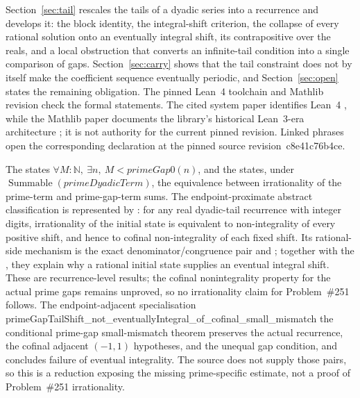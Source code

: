 \documentclass[11pt]{article}
\renewcommand{\commitshort}{c8e41c76b4ce}
\begin{document}
Section~\ref{sec:tail} rescales the tails of a dyadic series into a recurrence
and develops it: the block identity, the integral-shift criterion, the
collapse of every rational solution onto an eventually integral shift, its
contrapositive over the reals, and a local obstruction that converts an
infinite-tail condition into a single comparison of gaps.
Section~\ref{sec:carry} shows that the tail constraint does not by itself make
the coefficient sequence eventually periodic, and Section~\ref{sec:open} states
the remaining obligation.  The pinned Lean~4 toolchain and Mathlib revision
check the formal statements.  The cited system paper identifies Lean~4
\cite[abstract and \S1, pp.~625--626]{lean4}, while the Mathlib paper documents
the library's historical Lean~3-era architecture
\cite[abstract and \S1.1, p.~367]{mathlib}; it is not authority for the current
pinned revision.  Linked phrases open the corresponding declaration at the
pinned source revision~\commitshort.

The
 states $\forall M:\mathbb N,\ \exists n,\ M<\mathit{primeGap0}(n)$,
and the
 states, under
$\operatorname{Summable}(\mathit{primeDyadicTerm})$, the equivalence between
irrationality of the prime-term and prime-gap-term sums.  The endpoint-proximate
abstract classification is represented by
: for any real dyadic-tail recurrence with integer
digits, irrationality of the initial state is equivalent to non-integrality of
every positive shift, and hence to cofinal non-integrality of each fixed shift.
Its rational-side mechanism is the exact denominator/congruence pair
 and
; together with the
, they explain why a rational initial state supplies an eventual
integral shift.  These are recurrence-level results; the cofinal
nonintegrality property for the actual prime gaps remains unproved, so no
irrationality claim for Problem~\#251 follows.  The endpoint-adjacent
specialisation
      {primeGapTailShift_not_eventuallyIntegral_of_cofinal_small_mismatch}
      {the conditional prime-gap small-mismatch theorem} preserves the
actual recurrence, the cofinal adjacent $(-1,1)$ hypotheses, and the unequal
gap condition, and concludes failure of eventual integrality.  The source
does not supply those pairs, so this is a reduction exposing the missing
prime-specific estimate, not a proof of Problem~\#251 irrationality.
\end{document}
